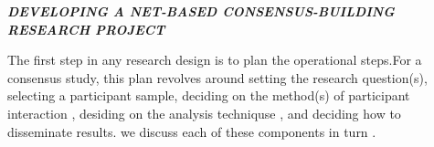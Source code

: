 \documentclass[10pt,a4paper]{book}
\begin{document}
\begin{flushleft}
\textbf{\textsl{ DEVELOPING A NET-BASED CONSENSUS-BUILDING RESEARCH PROJECT }}
 
\end{flushleft}

The first step in any research design is to plan the operational steps.For a consensus study, this plan revolves around setting the research question(s), selecting a participant sample, deciding on the method(s) of participant interaction , desiding on the analysis techniquse , and deciding how to disseminate results. we discuss each of these components in turn . 
\end{document}
